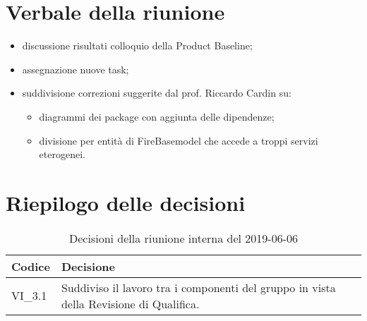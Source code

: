\section{Verbale della riunione}
\begin{itemize}
	\item discussione risultati colloquio della Product Baseline\glo;
	\item assegnazione nuove task;
	\item suddivisione correzioni suggerite dal prof. Riccardo Cardin su:
	\begin{itemize}
		\item diagrammi dei package con aggiunta delle dipendenze;
		\item divisione per entità di FireBase\glosp model che accede a troppi servizi eterogenei.
	\end{itemize}

\end{itemize} 

\section{Riepilogo delle decisioni}

	
	\begin{longtable}{ >{\centering}p{} >{}p{}}
		\caption{Decisioni della riunione interna del 2019-06-06}\\	
		\rowcolorhead
		\textbf{\color{white}Codice} 
		& \centering\textbf{\color{white}Decisione} 
		\tabularnewline 
		\endfirsthead
		VI\_3.1 & Suddiviso il lavoro tra i componenti del gruppo in vista della Revisione di Qualifica.
		
	\end{longtable}
	




